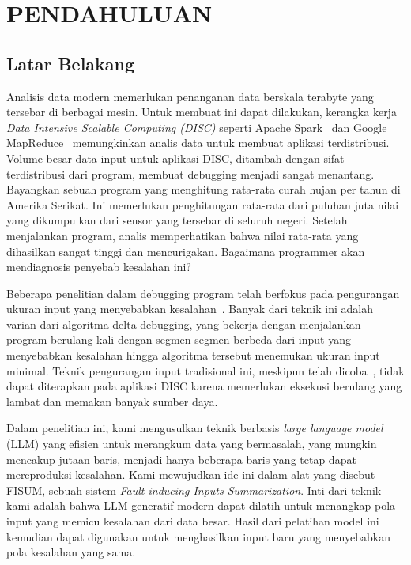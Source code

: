 \chapter{PENDAHULUAN}\label{chap:pendahuluan}


\section{Latar Belakang}\label{sec:latarbelakang}

Analisis data modern memerlukan penanganan data berskala 
terabyte yang tersebar di berbagai mesin. Untuk membuat 
ini dapat dilakukan, kerangka kerja 
\emph{Data Intensive Scalable Computing (DISC)} seperti 
Apache Spark~\cite{zaharia2010,spark} dan 
Google MapReduce~\cite{dean2008} memungkinkan analis 
data untuk membuat aplikasi terdistribusi. Volume besar 
data input untuk aplikasi DISC, ditambah dengan sifat 
terdistribusi dari program, membuat debugging menjadi 
sangat menantang.
Bayangkan sebuah program yang menghitung rata-rata 
curah hujan per tahun di Amerika Serikat. Ini 
memerlukan penghitungan rata-rata dari puluhan 
juta nilai yang dikumpulkan dari sensor yang 
tersebar di seluruh negeri. Setelah menjalankan 
program, analis memperhatikan bahwa nilai rata-rata 
yang dihasilkan sangat tinggi dan mencurigakan. 
Bagaimana programmer akan mendiagnosis penyebab 
kesalahan ini?

Beberapa penelitian dalam debugging program telah 
berfokus pada pengurangan ukuran input yang 
menyebabkan kesalahan~\cite{zeller2002,misherghi2006,kirschner2020,clause2009}.
Banyak dari teknik ini 
adalah varian dari algoritma delta debugging, 
yang bekerja dengan menjalankan program berulang 
kali dengan segmen-segmen berbeda dari input yang 
menyebabkan kesalahan hingga algoritma tersebut 
menemukan ukuran input minimal. Teknik pengurangan 
input tradisional ini, meskipun telah dicoba~\cite{gulzar2018}, tidak 
dapat diterapkan pada aplikasi DISC karena memerlukan 
eksekusi berulang yang lambat dan memakan banyak 
sumber daya.

Dalam penelitian ini, kami mengusulkan teknik berbasis 
\emph{large language model} (LLM) yang efisien untuk 
merangkum data yang bermasalah, yang mungkin mencakup 
jutaan baris, menjadi hanya beberapa baris yang tetap 
dapat mereproduksi kesalahan. Kami mewujudkan ide ini 
dalam alat yang disebut FISUM, sebuah sistem 
\emph{Fault-inducing Inputs Summarization}. 
Inti dari teknik kami adalah bahwa LLM generatif 
modern dapat dilatih untuk menangkap pola input 
yang memicu kesalahan dari data besar. Hasil dari 
pelatihan model ini kemudian dapat digunakan untuk 
menghasilkan input baru yang menyebabkan pola 
kesalahan yang sama.

